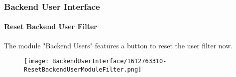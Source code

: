 %

\begin{frame}[fragile]
	\frametitle{Backend User Interface}
	\framesubtitle{Reset Backend User Filter}

	The module "Backend Users" features a button to reset the user filter now.

	\begin{figure}
		\texttt{[image: BackendUserInterface/1612763310-ResetBackendUserModuleFilter.png]}
	\end{figure}

\end{frame}

